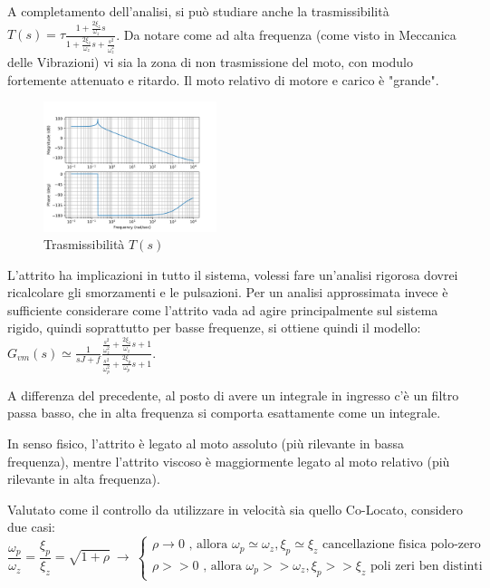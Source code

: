 A completamento dell'analisi, si può studiare anche la trasmissibilità \(T(s) = \tau \frac{1+\frac{2\xi_z}{\omega_z}s}{1+\frac{2\xi_z}{\omega_z}s + \frac{s^2}{\omega_z^2}}\). Da notare come ad alta frequenza (come visto in Meccanica delle Vibrazioni) vi sia la zona di non trasmissione del moto, con modulo fortemente attenuato e ritardo. Il moto relativo di motore e carico è "grande".

\begin{figure}[h]
    \centering
    \includegraphics[width=0.45\textwidth]{Immagini/trasmissibilita.png}
    \caption{Trasmissibilità \(T(s)\)}
\end{figure}

L'attrito ha implicazioni in tutto il sistema, volessi fare un'analisi rigorosa dovrei ricalcolare gli smorzamenti e le pulsazioni. Per un analisi approssimata invece è sufficiente considerare come l'attrito vada ad agire principalmente sul sistema rigido, quindi soprattutto per basse frequenze, si ottiene quindi il modello: \(G_{vm}(s) \simeq \frac{1}{sJ+f} \frac{\frac{s^2}{\omega_z^2} + \frac{2\xi_z}{\omega_z} s + 1}{\frac{s^2}{\omega_p^2} + \frac{2\xi_p}{\omega_p} s + 1}\). 

A differenza del precedente, al posto di avere un integrale in ingresso c'è un filtro passa basso, che in alta frequenza si comporta esattamente come un integrale.

In senso fisico, l'attrito è legato al moto assoluto (più rilevante in bassa frequenza), mentre l'attrito viscoso è maggiormente legato al moto relativo (più rilevante in alta frequenza).

Valutato come il controllo da utilizzare in velocità sia quello Co-Locato, considero due casi:
\[
\frac{\omega_p}{\omega_z} = \frac{\xi_p}{\xi_z} = \sqrt{1+\rho} \ \rightarrow \
\begin{cases}
    \rho \rightarrow 0 \text{ , allora } \omega_p\simeq \omega_z, \xi_p\simeq \xi_z \text{ cancellazione fisica polo-zero} \\
    \rho >> 0 \text{ , allora } \omega_p >> \omega_z, \xi_p >> \xi_z \text{ poli zeri ben distinti}
\end{cases}
\]

